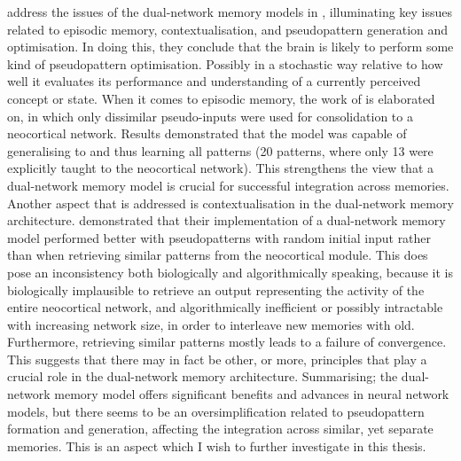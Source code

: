 \cite{French2001} address the issues of the dual-network memory models in \citep{French1997, Ans1997}, illuminating key issues related to episodic memory, contextualisation, and pseudopattern generation and optimisation. In doing this, they conclude that the brain is likely to perform some kind of pseudopattern optimisation. Possibly in a stochastic way relative to how well it evaluates its performance and understanding of a currently perceived concept or state. When it comes to episodic memory, the work of \cite{Ans2000} is elaborated on, in which only dissimilar pseudo-inputs were used for consolidation to a neocortical network. Results demonstrated that the model was capable of generalising to and thus learning all patterns (20 patterns, where only 13 were explicitly taught to the neocortical network). This strengthens the view that a dual-network memory model is crucial for successful integration across memories. Another aspect that is addressed is contextualisation in the dual-network memory architecture. \cite{Ans2000} demonstrated that their implementation of a dual-network memory model performed better with pseudopatterns with random initial input rather than when retrieving similar patterns from the neocortical module. This does pose an inconsistency both biologically and algorithmically speaking, because it is biologically implausible to retrieve an output representing the activity of the entire neocortical network, and algorithmically inefficient or possibly intractable with increasing network size, in order to interleave new memories with old. Furthermore, retrieving similar patterns mostly leads to a failure of convergence. This suggests that there may in fact be other, or more, principles that play a crucial role in the dual-network memory architecture. Summarising; the dual-network memory model offers significant benefits and advances in neural network models, but there seems to be an oversimplification related to pseudopattern formation and generation, affecting the integration across similar, yet separate memories. This is an aspect which I wish to further investigate in this thesis.

